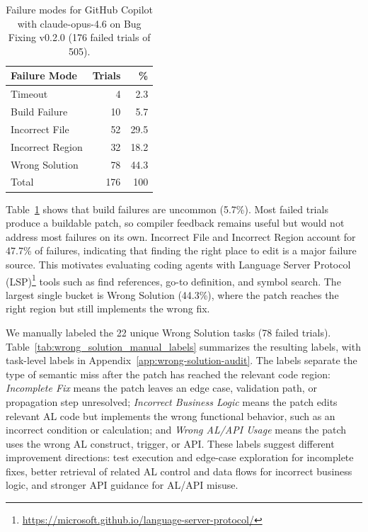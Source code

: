 \documentclass{article}
\begin{document}
\begin{table}[t]
\vskip 0.05in
\begin{center}
\begin{small}
\begin{sc}
\begin{tabular}{lrr}
\toprule
\textbf{Failure Mode} & \textbf{Trials} & \textbf{\%} \\
\midrule
Timeout                             &   4 &  2.3 \\
Build Failure                       &  10 &  5.7 \\
Incorrect File                      &  52 & 29.5 \\
Incorrect Region                    &  32 & 18.2 \\
Wrong Solution                      &  78 & 44.3 \\
\midrule
Total                               & 176 & 100  \\
\bottomrule
\end{tabular}
\end{sc}
\end{small}
\end{center}
\caption{Failure modes for GitHub Copilot with claude-opus-4.6 on Bug Fixing v0.2.0 (176 failed trials of 505).}
\label{tab:failure_modes}
\vskip 0.1in
\end{table}

Table~\ref{tab:failure_modes} shows that build failures are uncommon (5.7\%). Most failed trials produce a buildable patch, so compiler feedback remains useful but would not address most failures on its own. Incorrect File and Incorrect Region account for 47.7\% of failures, indicating that finding the right place to edit is a major failure source. This motivates evaluating coding agents with Language Server Protocol (LSP)\footnote{\href{https://microsoft.github.io/language-server-protocol/}{https://microsoft.github.io/language-server-protocol/}} tools such as find references, go-to definition, and symbol search. The largest single bucket is Wrong Solution (44.3\%), where the patch reaches the right region but still implements the wrong fix.

We manually labeled the 22 unique Wrong Solution tasks (78 failed trials). Table~\ref{tab:wrong_solution_manual_labels} summarizes the resulting labels, with task-level labels in Appendix~\ref{app:wrong-solution-audit}. The labels separate the type of semantic miss after the patch has reached the relevant code region: \emph{Incomplete Fix} means the patch leaves an edge case, validation path, or propagation step unresolved; \emph{Incorrect Business Logic} means the patch edits relevant AL code but implements the wrong functional behavior, such as an incorrect condition or calculation; and \emph{Wrong AL/API Usage} means the patch uses the wrong AL construct, trigger, or API. These labels suggest different improvement directions: test execution and edge-case exploration for incomplete fixes, better retrieval of related AL control and data flows for incorrect business logic, and stronger API guidance for AL/API misuse.
\end{document}
